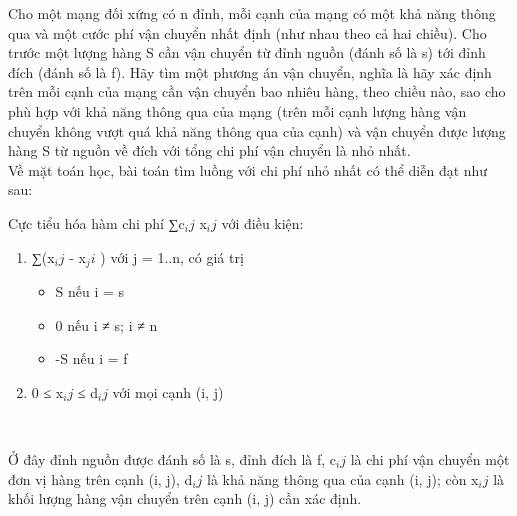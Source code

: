 Cho một mạng đối xứng có n đỉnh, mỗi cạnh của mạng có một khả năng thông qua và một cước phí vận chuyển nhất định (như nhau theo cả hai chiều). Cho trước một lượng hàng S cần vận chuyển từ đỉnh nguồn (đánh số là s) tới đỉnh đích (đánh số là f). Hãy tìm một phương án vận chuyển, nghĩa là hãy xác định trên mỗi cạnh của mạng cần vận chuyển bao nhiêu hàng, theo chiều nào, sao cho phù hợp với khả năng thông qua của mạng (trên mỗi cạnh lượng hàng vận chuyển không vượt quá khả năng thông qua của cạnh) và vận chuyển được lượng hàng S từ nguồn về đích với tổng chi phí vận chuyển là nhỏ nhất.
\\Về mặt toán học, bài toán tìm luồng với chi phí nhỏ nhất có thể diễn đạt như sau:

Cực tiểu hóa hàm chi phí ∑c$_ij $ x$_ij $ với điều kiện:
\begin{enumerate}
	\item ∑(x$_ij $ - x$_ji $ ) với j = 1..n, có giá trị
\begin{itemize}
	\item S nếu i = s
	\item 0 nếu i ≠ s; i ≠ n
	\item -S nếu i = f
\end{itemize}
	\item 0 ≤ x$_ij $ ≤ d$_ij $ với mọi cạnh (i, j)

 
\end{enumerate}

Ở đây đỉnh nguồn được đánh số là s, đỉnh đích là f, c$_ij $ là chi phí vận chuyển một đơn vị hàng trên cạnh (i, j), d$_ij $ là khả năng thông qua của cạnh (i, j); còn x$_ij $ là khối lượng hàng vận chuyển trên cạnh (i, j) cần xác định.